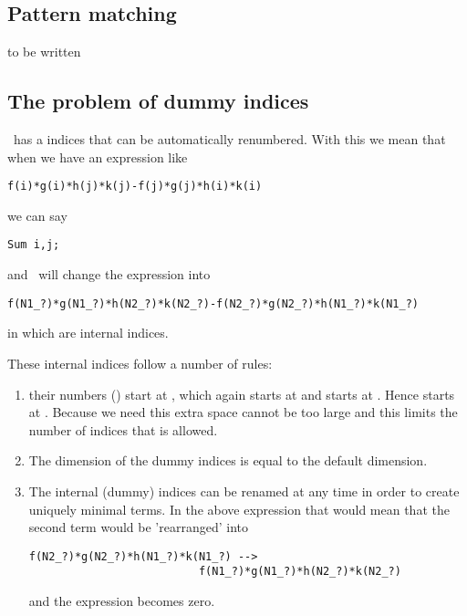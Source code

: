 \label{sec:indepth}

\subsection{Pattern matching}

to be written

\subsection{The problem of dummy indices}

\FORM\ has a indices that can be automatically renumbered. With this we mean 
that when we have an expression like

\begin{verbatim}
f(i)*g(i)*h(j)*k(j)-f(j)*g(j)*h(i)*k(i)
\end{verbatim}

we can say

\begin{verbatim}
Sum i,j;
\end{verbatim}

and \FORM\ will change the expression into

\begin{verbatim}
f(N1_?)*g(N1_?)*h(N2_?)*k(N2_?)-f(N2_?)*g(N2_?)*h(N1_?)*k(N1_?)
\end{verbatim}

in which  are internal indices.

These internal indices follow a number of rules:
\begin{enumerate}
\item
   their numbers () start at , which again starts at 
    and  starts at .
   Hence  starts at .
   Because we need this extra space  cannot be too large and this 
   limits the number of indices that is allowed.
\item The dimension of the dummy indices is equal to the default dimension.
\item The internal (dummy) indices can be renamed at any time in order to 
   create uniquely minimal terms. In the above expression that would mean 
   that the second term would be 'rearranged' into
\begin{verbatim}
f(N2_?)*g(N2_?)*h(N1_?)*k(N1_?) -->
                          f(N1_?)*g(N1_?)*h(N2_?)*k(N2_?)
\end{verbatim}
   and the expression becomes zero.
\end{enumerate}

